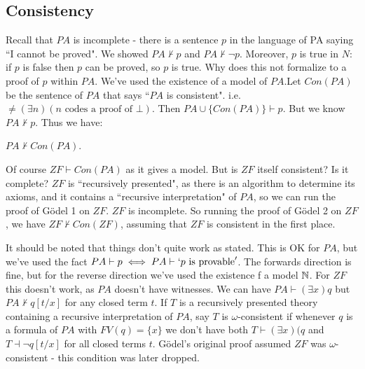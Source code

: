\documentclass[10pt,a4paper]{article}
\begin{document}
\subsection{Consistency}
Recall that $PA$ is incomplete - there is a sentence $p$ in the language of PA saying ``I cannot be proved". We showed $PA \nvdash p$ and $PA \nvdash \neg p$. Moreover, $p$ is true in $N$: if $p$ is false then $p$ can be proved, so $p$ is true. Why does this not formalize to a proof of $p$ within $PA$. We've used the existence of a model of $PA$.Let $Con(PA)$ be the sentence of $PA$ that says ``$PA$ is consistent". i.e. $\neq(\exists n)(n\text{ codes a proof of }\bot)$. Then $PA \cup\{Con(PA)\} \vdash p$. But we know $PA \nvdash p$. Thus we have:
\begin{theorem}
$PA \nvdash Con(PA)$.
\end{theorem}
Of course $ZF \vdash Con(PA)$ as it gives a model. But is $ZF$ itself consistent? Is it complete? $ZF$ is ``recursively presented", as there is an algorithm to determine its axioms, and it contains a ``recursive interpretation" of $PA$, so we can run the proof of G\"odel 1 on $ZF$. $ZF$ is incomplete. So running the proof of G\"odel 2 on $ZF$, we have $ZF \nvdash Con(ZF)$, assuming that $ZF$ is consistent in the first place.

It should be noted that things don't quite work as stated. This is OK for $PA$, but we've used the fact $PA \vdash p \iff PA \vdash `p \text{ is provable}'$. The forwards direction is fine, but for the reverse direction we've used the existence f a model $\mathbb{N}$. For $ZF$ this doesn't work, as $PA$ doesn't have witnesses. We can have $PA \vdash (\exists x)q$ but $PA \nvdash q[t/x]$ for any closed term $t$. If $T$ is a recursively presented theory containing a recursive interpretation of $PA$, say $T$ is $\omega$-consistent if whenever $q$ is a formula of $PA$ with $FV(q) = \{x\}$ we don't have both $T \vdash (\exists x)(q$ and $T \dashv \neg q[t/x]$ for all closed terms $t$. G\"odel's original proof assumed $ZF$ was $\omega$-consistent - this condition was later dropped.
\end{document}
